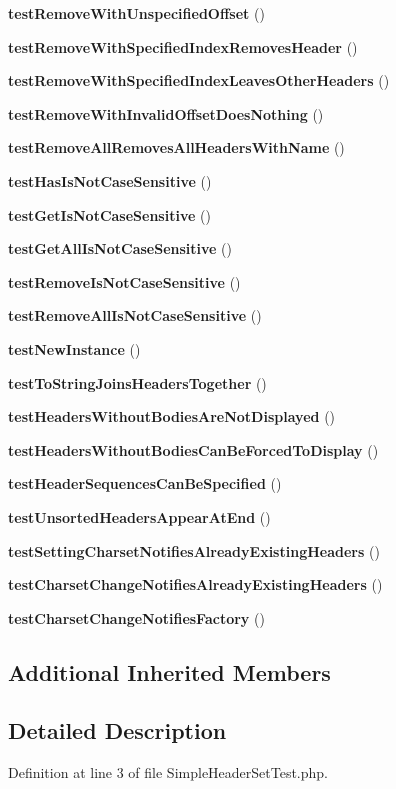 \begin{DoxyCompactItemize}
\item 
{\bf test\+Remove\+With\+Unspecified\+Offset} ()
\item 
{\bf test\+Remove\+With\+Specified\+Index\+Removes\+Header} ()
\item 
{\bf test\+Remove\+With\+Specified\+Index\+Leaves\+Other\+Headers} ()
\item 
{\bf test\+Remove\+With\+Invalid\+Offset\+Does\+Nothing} ()
\item 
{\bf test\+Remove\+All\+Removes\+All\+Headers\+With\+Name} ()
\item 
{\bf test\+Has\+Is\+Not\+Case\+Sensitive} ()
\item 
{\bf test\+Get\+Is\+Not\+Case\+Sensitive} ()
\item 
{\bf test\+Get\+All\+Is\+Not\+Case\+Sensitive} ()
\item 
{\bf test\+Remove\+Is\+Not\+Case\+Sensitive} ()
\item 
{\bf test\+Remove\+All\+Is\+Not\+Case\+Sensitive} ()
\item 
{\bf test\+New\+Instance} ()
\item 
{\bf test\+To\+String\+Joins\+Headers\+Together} ()
\item 
{\bf test\+Headers\+Without\+Bodies\+Are\+Not\+Displayed} ()
\item 
{\bf test\+Headers\+Without\+Bodies\+Can\+Be\+Forced\+To\+Display} ()
\item 
{\bf test\+Header\+Sequences\+Can\+Be\+Specified} ()
\item 
{\bf test\+Unsorted\+Headers\+Appear\+At\+End} ()
\item 
{\bf test\+Setting\+Charset\+Notifies\+Already\+Existing\+Headers} ()
\item 
{\bf test\+Charset\+Change\+Notifies\+Already\+Existing\+Headers} ()
\item 
{\bf test\+Charset\+Change\+Notifies\+Factory} ()
\end{DoxyCompactItemize}
\subsection*{Additional Inherited Members}


\subsection{Detailed Description}


Definition at line 3 of file Simple\+Header\+Set\+Test.\+php.



